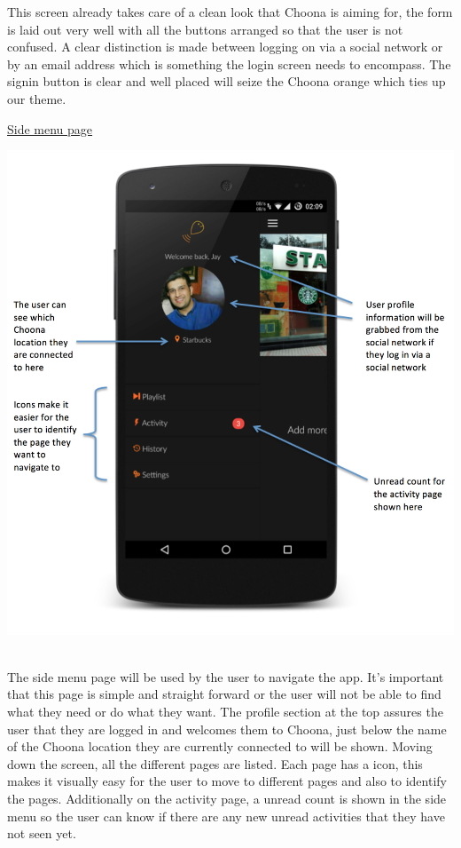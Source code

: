 This screen already takes care of a clean look that Choona is aiming for, the form is laid out very well with all the buttons arranged so that the user is not confused. A clear distinction is made between logging on via a social network or by an email address which is something the login screen needs to encompass. The signin button is clear and well placed will seize the Choona orange which ties up our theme.\\

\newpage

\noindent\underline{Side menu page}\newline

\noindent
\begin{minipage}{\linewidth}
\centering
\includegraphics[scale=0.5]{./img/sidemenuannotated.png}
\label{fig:sidemenu}
\end{minipage}\\

The side menu page will be used by the user to navigate the app. It's important that this page is simple and straight forward or the user will not be able to find what they need or do what they want. The profile section at the top assures the user that they are logged in and welcomes them to Choona, just below the name of the Choona location they are currently connected to will be shown. Moving down the screen, all the different pages are listed. Each page has a icon, this makes it visually easy for the user to move to different pages and also to identify the pages. Additionally on the activity page, a unread count is shown in the side menu so the user can know if there are any new unread activities that they have not seen yet.\\

